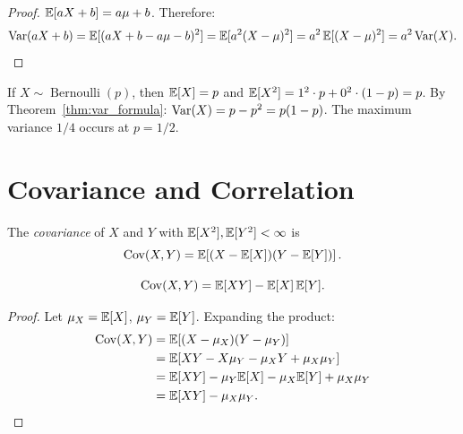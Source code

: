 \documentclass[11pt,a4paper]{article}
\begin{document}
\begin{proof}
$\mathbb{E}[aX + b] = a\mu + b$.  Therefore:
\begin{equation}
  \operatorname{Var}(aX + b) = \mathbb{E}[(aX + b - a\mu - b)^2]
  = \mathbb{E}[a^2(X - \mu)^2]
  = a^2\, \mathbb{E}[(X - \mu)^2] = a^2 \operatorname{Var}(X). \qedhere
\end{equation}
\end{proof}

\begin{example}
\label{ex:bernoulli_var}
If $X \sim \operatorname{Bernoulli}(p)$, then $\mathbb{E}[X] = p$ and
$\mathbb{E}[X^2] = 1^2 \cdot p + 0^2 \cdot (1-p) = p$.  By
Theorem~\ref{thm:var_formula}:
$\operatorname{Var}(X) = p - p^2 = p(1 - p)$.
The maximum variance $1/4$ occurs at $p = 1/2$.
\end{example}


\section{Covariance and Correlation}
\label{sec:covariance}

\begin{definition}[Covariance]
\label{def:covariance}
The \emph{covariance} of $X$ and $Y$ with
$\mathbb{E}[X^2], \mathbb{E}[Y^2] < \infty$ is
\begin{equation}
  \operatorname{Cov}(X, Y) = \mathbb{E}\!\left[(X - \mathbb{E}[X])(Y - \mathbb{E}[Y])\right].
  \label{eq:cov_def}
\end{equation}
\end{definition}

\begin{theorem}
\label{thm:cov_formula}
\begin{equation}
  \operatorname{Cov}(X, Y) = \mathbb{E}[XY] - \mathbb{E}[X]\,\mathbb{E}[Y].
  \label{eq:cov_formula}
\end{equation}
\end{theorem}

\begin{proof}
Let $\mu_X = \mathbb{E}[X]$, $\mu_Y = \mathbb{E}[Y]$.  Expanding the product:
\begin{align}
  \operatorname{Cov}(X, Y) &= \mathbb{E}[(X - \mu_X)(Y - \mu_Y)]
  \nonumber\\
  &= \mathbb{E}[XY - X\mu_Y - \mu_X Y + \mu_X \mu_Y]
  \nonumber\\
  &= \mathbb{E}[XY] - \mu_Y \mathbb{E}[X] - \mu_X \mathbb{E}[Y] + \mu_X \mu_Y
  \nonumber\\
  &= \mathbb{E}[XY] - \mu_X \mu_Y.
  \label{eq:cov_formula_proof}
\end{align}
\end{proof}
\end{document}
